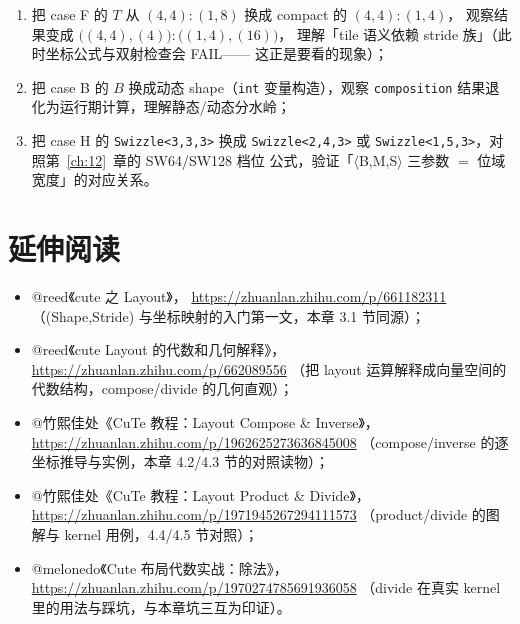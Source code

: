 \begin{enumerate}
  \item 把 case F 的 $T$ 从 $(4,4){:}(1,8)$ 换成 compact 的 $(4,4){:}(1,4)$，
        观察结果变成 $\bigl((4,4),(4)\bigr){:}\bigl((1,4),(16)\bigr)$，
        理解「tile 语义依赖 stride 族」（此时坐标公式与双射检查会 FAIL——
        这正是要看的现象）；
  \item 把 case B 的 $B$ 换成动态 shape（\texttt{int} 变量构造），观察
        \texttt{composition} 结果退化为运行期计算，理解静态/动态分水岭；
  \item 把 case H 的 \texttt{Swizzle\allowbreak{}<3,\allowbreak{}3,\allowbreak{}3>} 换成 \texttt{Swizzle\allowbreak{}<2,\allowbreak{}4,\allowbreak{}3>}
        或 \texttt{Swizzle\allowbreak{}<1,\allowbreak{}5,\allowbreak{}3>}，对照第~\ref{ch:12}~章的 SW64/SW128 档位
        公式，验证「$\langle$B,M,S$\rangle$ 三参数 $=$ 位域宽度」的对应关系。
\end{enumerate}

\section*{延伸阅读}

\begin{itemize}
  \item @reed《cute 之 Layout》，
        \url{https://zhuanlan.zhihu.com/p/661182311}
        （(Shape,Stride) 与坐标映射的入门第一文，本章 3.1 节同源）；
  \item @reed《cute Layout 的代数和几何解释》，
        \url{https://zhuanlan.zhihu.com/p/662089556}
        （把 layout 运算解释成向量空间的代数结构，compose/divide 的几何直观）；
  \item @竹熙佳处《CuTe 教程：Layout Compose \& Inverse》，
        \url{https://zhuanlan.zhihu.com/p/1962625273636845008}
        （compose/inverse 的逐坐标推导与实例，本章 4.2/4.3 节的对照读物）；
  \item @竹熙佳处《CuTe 教程：Layout Product \& Divide》，
        \url{https://zhuanlan.zhihu.com/p/1971945267294111573}
        （product/divide 的图解与 kernel 用例，4.4/4.5 节对照）；
  \item @melonedo《Cute 布局代数实战：除法》，
        \url{https://zhuanlan.zhihu.com/p/1970274785691936058}
        （divide 在真实 kernel 里的用法与踩坑，与本章坑三互为印证）。
\end{itemize}
